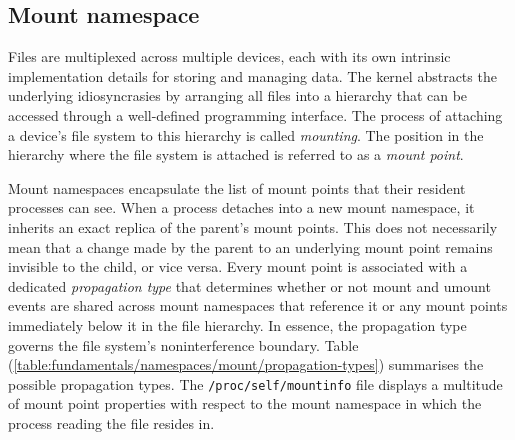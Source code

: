 

\subsection{Mount namespace}
\label{sections:fundamentals/namespaces/mount}
Files are multiplexed across multiple devices, each with its own intrinsic implementation details 
for storing and managing data. The kernel abstracts the underlying idiosyncrasies 
by arranging all files into a hierarchy that can be accessed through a well-defined programming interface. 
The process of attaching a device's file system 
to this hierarchy is called \textit{mounting}. The position in the hierarchy where the file system 
is attached is referred to as a \textit{mount point}.

Mount namespaces encapsulate the list of mount points that their resident processes can 
see. When a process detaches into a new mount namespace, it inherits an exact replica of the parent's mount points.
This does not necessarily mean that a change made by the parent to an underlying mount point remains 
invisible to the child, or vice versa. Every mount point is associated with a dedicated \textit{propagation type} 
that determines whether or not mount and umount events are shared across mount namespaces 
that reference it or any mount points immediately below it in the file hierarchy.  
In essence, the propagation type governs the file system's noninterference boundary. 
Table (\ref{table:fundamentals/namespaces/mount/propagation-types}) summarises the possible 
propagation types. The \verb|/proc/self/mountinfo| file 
displays a multitude of mount point properties with respect to the mount namespace in which 
the process reading the file resides in. 

